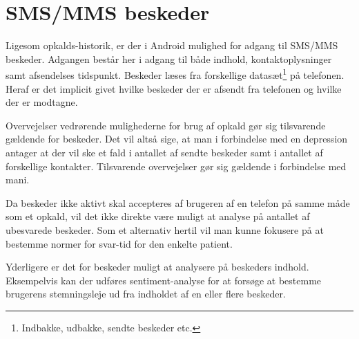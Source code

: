 \section{SMS/MMS beskeder}
Ligesom opkalds-historik, er der i Android mulighed for adgang til SMS/MMS beskeder.
Adgangen består her i adgang til både indhold, kontaktoplysninger samt afsendelses tidspunkt.
Beskeder læses fra forskellige datasæt\footnote{Indbakke, udbakke, sendte beskeder etc.} på telefonen.
Heraf er det implicit givet hvilke beskeder der er afsendt fra telefonen og hvilke der er modtagne.

Overvejelser vedrørende mulighederne for brug af opkald gør sig tilsvarende gældende for beskeder.
Det vil altså sige, at man i forbindelse med en depression antager at der vil ske et fald i antallet af sendte beskeder samt i antallet af forskellige kontakter.
Tilsvarende overvejelser gør sig gældende i forbindelse med mani.

Da beskeder ikke aktivt skal accepteres af brugeren af en telefon på samme måde som et opkald, vil det ikke direkte være muligt at analyse på antallet af ubesvarede beskeder.
Som et alternativ hertil vil man kunne fokusere på at bestemme normer for svar-tid for den enkelte patient.

Yderligere er det for beskeder muligt at analysere på beskeders indhold.
Eksempelvis kan der udføres sentiment-analyse for at forsøge at bestemme brugerens stemningsleje ud fra indholdet af en eller flere beskeder.
